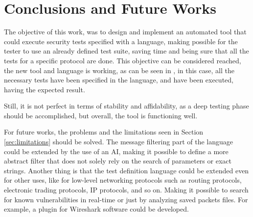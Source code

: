 \chapter{Conclusions and Future Works}
\label{chap:Conclusions}
The objective of this work, was to design and implement an automated tool that could execute security tests specified with a language, making possible for the tester to use an already defined test suite, saving time and being sure that all the tests for a specific protocol are done. This objective can be considered reached, the new tool and language is working, as can be seen in \cite{sofia_zanrosso}, in this case, all the necessary tests have been specified in the language, and have been executed, having the expected result. 

Still, it is not perfect in terms of stability and affidability, as a deep testing phase should be accomplished, but overall, the tool is functioning well.

For future works, the problems and the limitations seen in Section \ref{sec:limitations} should be solved. The message filtering part of the language could be extended by the use of an AI, making it possible to define a more abstract filter that does not solely rely on the search of parameters or exact strings. Another thing is that the test definition language could be extended even for other uses, like for low-level networking protocols such as routing protocols, electronic trading protocols, IP protocols, and so on. Making it possible to search for known vulnerabilities in real-time or just by analyzing saved packets files. For example, a plugin for Wireshark software could be developed.
%





